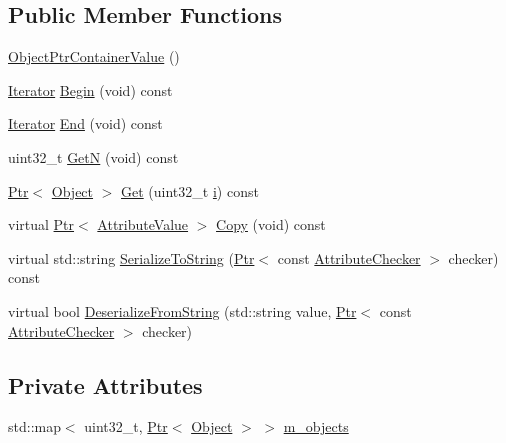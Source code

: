\subsection*{Public Member Functions}
\begin{DoxyCompactItemize}
\item 
\hyperlink{classns3_1_1ObjectPtrContainerValue_accba7d6a658dd738b4d7e53c244e8d14}{Object\+Ptr\+Container\+Value} ()
\item 
\hyperlink{classns3_1_1ObjectPtrContainerValue_a1f0661f9cf3626d62a4623f36b672876}{Iterator} \hyperlink{classns3_1_1ObjectPtrContainerValue_a2dd05c2e7483eb2eeeb0b2389f238815}{Begin} (void) const 
\item 
\hyperlink{classns3_1_1ObjectPtrContainerValue_a1f0661f9cf3626d62a4623f36b672876}{Iterator} \hyperlink{classns3_1_1ObjectPtrContainerValue_a45b7448cf99d2629260c21f740b904d0}{End} (void) const 
\item 
uint32\+\_\+t \hyperlink{classns3_1_1ObjectPtrContainerValue_a0b282241030189e3f60e76e52d176710}{GetN} (void) const 
\item 
\hyperlink{classns3_1_1Ptr}{Ptr}$<$ \hyperlink{classns3_1_1Object}{Object} $>$ \hyperlink{classns3_1_1ObjectPtrContainerValue_ad9f4d85a7345b797cb3521d17b979b47}{Get} (uint32\+\_\+t \hyperlink{lte__uplink__power__control_8m_a6f6ccfcf58b31cb6412107d9d5281426}{i}) const 
\item 
virtual \hyperlink{classns3_1_1Ptr}{Ptr}$<$ \hyperlink{classns3_1_1AttributeValue}{Attribute\+Value} $>$ \hyperlink{classns3_1_1ObjectPtrContainerValue_a3712d2eefed01e45b33394d31c1465db}{Copy} (void) const 
\item 
virtual std\+::string \hyperlink{classns3_1_1ObjectPtrContainerValue_a2909bb8cabd86eb28a8c6a3336906864}{Serialize\+To\+String} (\hyperlink{classns3_1_1Ptr}{Ptr}$<$ const \hyperlink{classns3_1_1AttributeChecker}{Attribute\+Checker} $>$ checker) const 
\item 
virtual bool \hyperlink{classns3_1_1ObjectPtrContainerValue_a8c4a50a90e2febfe4c912849ee56fc10}{Deserialize\+From\+String} (std\+::string value, \hyperlink{classns3_1_1Ptr}{Ptr}$<$ const \hyperlink{classns3_1_1AttributeChecker}{Attribute\+Checker} $>$ checker)
\end{DoxyCompactItemize}
\subsection*{Private Attributes}
\begin{DoxyCompactItemize}
\item 
std\+::map$<$ uint32\+\_\+t, \hyperlink{classns3_1_1Ptr}{Ptr}$<$ \hyperlink{classns3_1_1Object}{Object} $>$ $>$ \hyperlink{classns3_1_1ObjectPtrContainerValue_ae30f64004994878b88193732c42c6d38}{m\+\_\+objects}
\end{DoxyCompactItemize}
